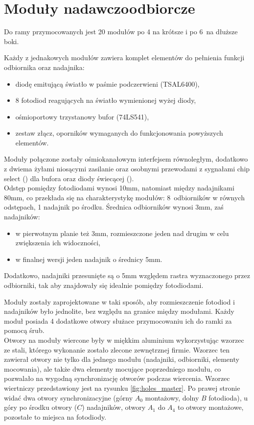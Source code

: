 \afterpage{\clearpage}

\section{Moduły nadawczo\ppauza{}odbiorcze}

Do ramy przymocowanych jest 20 modułów \pauza po 4 na krótsze i po 6~na dłuższe boki.

Każdy z jednakowych modułów zawiera komplet elementów do pełnienia funkcji odbiornika oraz nadajnika:
\begin{itemize}
 \item diodę emitującą światło w paśmie podczerwieni (TSAL6400),
 \item 8 fotodiod reagujących na światło wymienionej wyżej diody,
 \item ośmioportowy trzystanowy bufor (74LS541),
 \item zestaw złącz, oporników wymaganych do funkcjonowania powyższych elementów.
\end{itemize}

Moduły połączone zostały ośmiokanałowym interfejsem równoległym, dodatkowo z dwiema żyłami niosącymi zasilanie oraz osobnymi przewodami z sygnałami chip select () dla bufora oraz diody świecącej ().\\

Odstęp pomiędzy fotodiodami wynosi 10mm, natomiast między nadajnikami 80mm, co przekłada się na charakterystykę modułów: 8~odbiorników w równych odstępach, 1 nadajnik po środku.
Średnica odbiorników wynosi 3mm, zaś nadajników:
\begin{itemize}
 \item w pierwotnym planie też 3mm, rozmieszczone jeden nad drugim w celu zwiększenia ich widoczności,
 \item w finalnej wersji jeden nadajnik o średnicy 5mm.\\
\end{itemize}

Dodatkowo, nadajniki przesunięte są o 5mm względem rastra wyznaczonego przez odbiorniki, tak aby znajdowały się idealnie pomiędzy fotodiodami.

Moduły zostały zaprojektowane w taki sposób, aby rozmieszczenie fotodiod i nadajników było jednolite, bez względu na granice między modułami. Każdy moduł posiada 4 dodatkowe otwory służace przymocowaniu ich do ramki za pomocą śrub.\\

Otwory na moduły wiercone były w miękkim aluminium wykorzystując wzorzec ze stali, którego wykonanie zostało zlecone zewnętrznej firmie.
Wzorzec ten zawierał otwory nie tylko dla jednego modułu (nadajniki, odbiorniki, elementy mocowania), ale także dwa elementy mocujące poprzedniego modułu, co pozwalało na wygodną synchronizację otworów podczas wiercenia. Wzorzec wiertniczy przedstawiony jest na rysunku \ref{fig:holes_master}. Po prawej stronie widać dwa otwory synchronizacyjne (górny $A_0$ \ppauza montażowy, dolny $B$ \ppauza fotodioda), u góry po środku otwory ($C$) nadajników, otwory $A_1$ do $A_4$ to otwory montażowe, pozostałe to miejsca na fotodiody.\\

